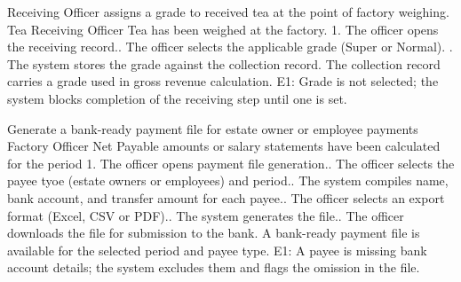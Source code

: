 {Receiving Officer assigns a grade to received tea at the point of factory weighing. }
{Tea Receiving Officer }
{Tea has been weighed at the factory. }
{1. The officer opens the receiving record.. The officer selects the applicable grade (Super or Normal). . The system stores the grade against the collection record. \newline
}
{The collection record carries a grade used in gross revenue calculation. }
{E1: Grade is not selected; the system blocks completion of the receiving step until one is set. }

{Generate a bank-ready payment file for estate owner or employee payments}
{Factory Officer}
{Net Payable amounts or salary statements have been calculated for the period}
{1. The officer opens payment file generation.. The officer selects the payee tyoe (estate owners or employees) and period.. The system compiles name, bank account, and transfer amount for each payee.. The officer selects an export format (Excel, CSV or PDF).. The system generates the file.. The officer downloads the file for submission to the bank.\newline}
{A bank-ready payment file is available for the selected period and payee type. }
{E1: A payee is missing bank account details; the system excludes them and flags the omission in the file. }